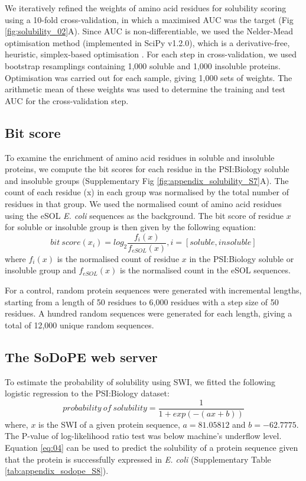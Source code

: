 We iteratively refined the weights of amino acid residues for solubility scoring using a 10-fold cross-validation, in which a maximised AUC was the target (Fig \ref{fig:solubility_02}A). Since AUC is non-differentiable, we used the Nelder-Mead optimisation method (implemented in SciPy v1.2.0), which is a derivative-free, heuristic, simplex-based optimisation \citep{Nelder1965-zb,Oliphant2007-za,Millman2011-tt}. For each step in cross-validation, we used bootstrap resamplings containing 1,000 soluble and 1,000 insoluble proteins. Optimisation was carried out for each sample, giving 1,000 sets of weights. The arithmetic mean of these weights was used to determine the training and test AUC for the cross-validation step. 


\subsection{Bit score}
To examine the enrichment of amino acid residues in soluble and insoluble proteins, we compute the bit scores for each residue in the PSI:Biology soluble and insoluble groups (Supplementary Fig \ref{fig:appendix_solubility_S7}A). The count of each residue (x) in each group was normalised by the total number of residues in that group. We used the normalised count of amino acid residues using the eSOL \textit{E. coli} sequences as the background. The bit score of residue $x$ for soluble or insoluble group is then given by the following equation:
%
\begin{equation}
    bit\ score (x_i) = log_2 \frac{f_i(x)}{f_{eSOL}(x)}, i =[soluble, insoluble]
    \label{eq:03}
\end{equation}
%
where $f_i(x)$ is the normalised count of residue $x$ in the PSI:Biology soluble or insoluble group and $f_{eSOL}(x)$  is the normalised count in the eSOL sequences.

For a control, random protein sequences were generated with incremental lengths, starting from a length of 50 residues to 6,000 residues with a step size of 50 residues. A hundred random sequences were generated for each length, giving a total of 12,000 unique random sequences.

\subsection{The SoDoPE web server}
To estimate the probability of solubility using SWI, we fitted the following logistic regression to the PSI:Biology dataset:
%
\begin{equation}
    probability\ of\ solubility = \frac{1}{1 + exp(-(ax + b))}
    \label{eq:04}
\end{equation}
%
where, $x$ is the SWI of a given protein sequence, $a = 81.05812$ and  $b = -62.7775$. The P-value of log-likelihood ratio test was below machine’s underflow level. Equation \ref{eq:04} can be used to predict the solubility of a protein sequence given that the protein is successfully expressed in \textit{E. coli} (Supplementary Table \ref{tab:appendix_sodope_S8}).


